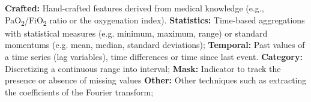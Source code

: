 \begin{table}[h!]
\begin{tblr}[
      caption = {asdasd},
      note{z} = {tonto}
    ]
    \bottomrule
    \end{tblr}
    \begin{tablenotes}
        \footnotesize
        \item \textbf{Crafted:} Hand-crafted features derived from medical knowledge (e.g., PaO\textsubscript{2}/FiO\textsubscript{2} ratio or the oxygenation index). \textbf{Statistics:} Time-based aggregations with statistical measures (e.g. minimum, maximum, range) or standard momentums (e.g. mean, median, standard deviations); \textbf{Temporal:} Past values of a time series (lag variables), time differences or time since last event. \textbf{Category:} Discretizing a continuous range into interval; \textbf{Mask:} Indicator to track the presence or absence of missing values \textbf{Other:} Other techniques such as extracting the coefficients of the Fourier transform;
      
    \end{tablenotes}

    
\label{tab:tblr-performance-ml-part1}
\end{table}
